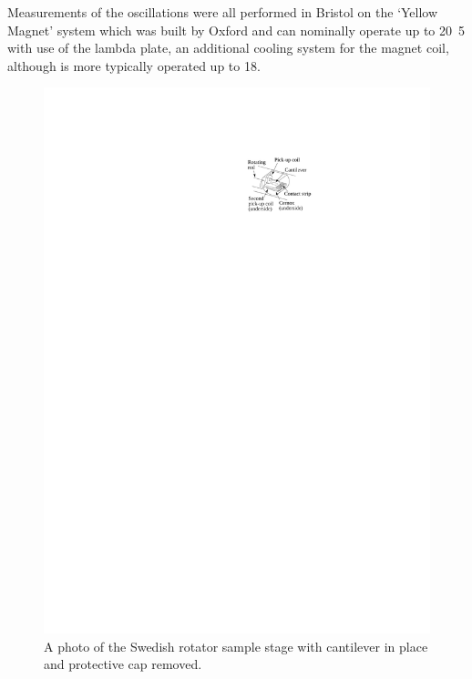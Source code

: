 Measurements of the oscillations were all performed in Bristol on the `Yellow Magnet' system which was built by Oxford and can nominally operate up to \unit{20.5}{\tesla} with use of the lambda plate, an additional cooling system for the magnet coil, although is more typically operated up to \unit{18}{\tesla}.
\begin{figure}[htbp]
    \begin{center}
        \includegraphics[scale=1.1]{Chapter-ExperimentalTechnique/Figures/SampleStageSchematic/SampleStageSchematic}
        \caption{A photo of the Swedish rotator sample stage with cantilever in place and protective cap removed.}
        \label{Fig:Exp:SampleStageSchematic}
    \end{center}
\end{figure}

